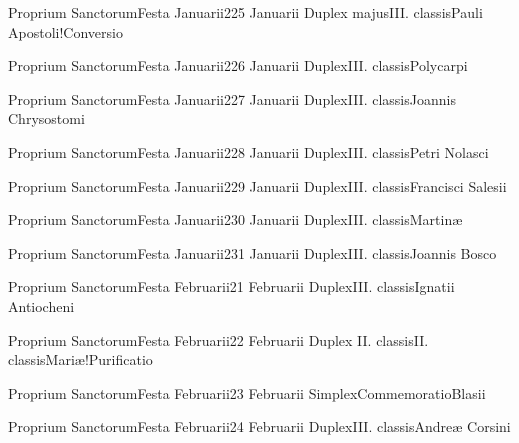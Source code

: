 \documentclass[invitatoriale-romanum.tex]{subfiles}
\begin{document}
	{Proprium Sanctorum}{Festa Januarii}{2}{25 Januarii}
	{Duplex majus}{III. classis}{Pauli Apostoli!Conversio}
	{}
	{}

	{Proprium Sanctorum}{Festa Januarii}{2}{26 Januarii}
	{Duplex}{III. classis}{Polycarpi}
	{}
	{}

	{Proprium Sanctorum}{Festa Januarii}{2}{27 Januarii}
	{Duplex}{III. classis}{Joannis Chrysostomi}
	{}
	{}

	{Proprium Sanctorum}{Festa Januarii}{2}{28 Januarii}
	{Duplex}{III. classis}{Petri Nolasci}
	{}
	{}

	{Proprium Sanctorum}{Festa Januarii}{2}{29 Januarii}
	{Duplex}{III. classis}{Francisci Salesii}
	{}
	{}

	{Proprium Sanctorum}{Festa Januarii}{2}{30 Januarii}
	{Duplex}{III. classis}{Martinæ}
	{}
	{}

	{Proprium Sanctorum}{Festa Januarii}{2}{31 Januarii}
	{Duplex}{III. classis}{Joannis Bosco}
	{}
	{}



	{Proprium Sanctorum}{Festa Februarii}{2}{1 Februarii}
	{Duplex}{III. classis}{Ignatii Antiocheni}
	{}
	{}

	{Proprium Sanctorum}{Festa Februarii}{2}{2 Februarii}
	{Duplex II. classis}{II. classis}{Mariæ!Purificatio}
	{}
	{}

	{Proprium Sanctorum}{Festa Februarii}{2}{3 Februarii}
	{Simplex}{Commemoratio}{Blasii}
	{}
	{\invitferia}

	{Proprium Sanctorum}{Festa Februarii}{2}{4 Februarii}
	{Duplex}{III. classis}{Andreæ Corsini}
	{}
	{}
\end{document}
